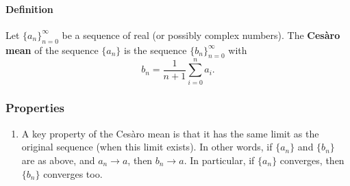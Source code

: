 \documentclass[12pt]{article}
\newcommand{\sequence}[1]{\{#1\}}
\begin{document}
\paragraph{Definition}
Let $\sequence{a_n}_{n=0}^\infty$ be a sequence of real (or possibly complex numbers).  
The {\bf Ces\`aro mean} of the sequence $\{a_n\}$ is the sequence $\{b_n\}_{n=0}^\infty$ 
with
\begin{equation}
b_n = \frac{1}{n+1} \sum_{i=0}^{n} a_i.
\end{equation}

\subsubsection{Properties}
\begin{enumerate}
\item
A key property of the Ces\`aro mean is that it has the same limit as the
original sequence (when this limit exists). In other words, if $\{a_n\}$ and 
$\{b_n\}$ are as above, and $a_n \to a$, then $b_n \to a$. 
In particular, if $\{a_n\}$ converges, then $\{b_n\}$ converges too.
\end{enumerate}
\end{document}
